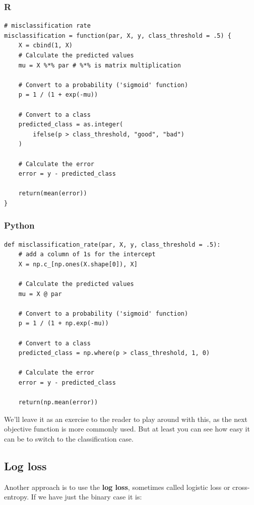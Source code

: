\documentclass[
  letterpaper,
]{krantz}
\begin{document}
\subsubsection{R}

\begin{verbatim}
# misclassification rate
misclassification = function(par, X, y, class_threshold = .5) {
    X = cbind(1, X)
    # Calculate the predicted values
    mu = X %*% par # %*% is matrix multiplication

    # Convert to a probability ('sigmoid' function)
    p = 1 / (1 + exp(-mu))

    # Convert to a class
    predicted_class = as.integer(
        ifelse(p > class_threshold, "good", "bad")
    )

    # Calculate the error
    error = y - predicted_class

    return(mean(error))
}
\end{verbatim}

\subsubsection{Python}

\begin{verbatim}
def misclassification_rate(par, X, y, class_threshold = .5):
    # add a column of 1s for the intercept
    X = np.c_[np.ones(X.shape[0]), X]

    # Calculate the predicted values
    mu = X @ par
    
    # Convert to a probability ('sigmoid' function)
    p = 1 / (1 + np.exp(-mu))
    
    # Convert to a class
    predicted_class = np.where(p > class_threshold, 1, 0)
    
    # Calculate the error
    error = y - predicted_class 
    
    return(np.mean(error))
\end{verbatim}

We'll leave it as an exercise to the reader to play around with this, as
the next objective function is more commonly used. But at least you can
see how easy it can be to switch to the classification case.

\subsection{Log loss}\label{sec-estim-logloss}

Another approach is to use the \textbf{log loss}, sometimes called
logistic loss or cross-entropy. If we have just the binary case it is:
\end{document}
